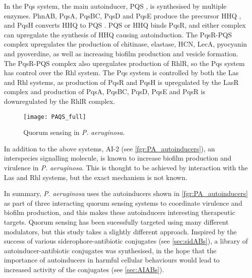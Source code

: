 In the Pqs system, the main autoinducer, PQS \cite{Pesci1999}, is synthesised by multiple enzymes. 
PhnAB\cite{Farrow2007}, PqsA, PqsBC, PqsD\cite{Lepine2003,Lepine2004} and PqsE\cite{Drees2015,Lin2018} produce the precursor HHQ , and PqsH converts HHQ  to PQS . 
PQS \cite{Wade2005} or HHQ  binds PqsR\cite{Xiao2006}, and either complex can upregulate the synthesis of HHQ  causing autoinduction. 
The PqsR-PQS complex upregulates the production of 
chitinase\cite{Deziel2005}, elastase\cite{Pesci1999}, HCN\cite{Deziel2005}, LecA\cite{Diggle2003}, pyocyanin\cite{Gallagher2002,Diggle2007} and pyoverdine\cite{Diggle2007}, as well as increasing biofilm production\cite{Diggle2003} and vesicle formation\cite{Mashburn2009}.
The PqsR-PQS complex also upregulates production of RhlR, so the Pqs system has control over the Rhl system\cite{McKnight2000}.
The Pqs system is controlled by both the Las and Rhl systems,
as production of PqsR\cite{Wade2005} and PqsH\cite{Gallagher2002} is upregulated by the LasR complex and 
production of PqsA, PqsBC, PqsD, PqsE\cite{McGrath2004} and PqsR\cite{Wade2005} is downregulated by the RhlR complex.


\begin{figure}[H]
	\begin{center}
		\texttt{[image: PAQS\_full]}
		\caption{Quorum sensing in \textit{P. aeruginosa}\cite{Dubern2008,Hodgkinson2011,Jimenez2012}. \label{fgr:PA_QS}}
	\end{center}
\end{figure}


In addition to the above systems, AI-2 (see \ref{fgr:PA_autoinducers}), an interspecies signalling molecule\cite{Pereira2013}, is known to increase biofilm production and virulence in \textit{P. aeruginosa}\cite{Li2015a,Li2017}. This is thought to be achieved by interaction with the Las and Rhl systems, but the exact mechanism is not known.

In summary, \textit{P. aeruginosa} uses the autoinducers shown in \ref{fgr:PA_autoinducers} as part of three interacting quorum sensing systems to coordinate virulence and biofilm production, and this makes these autoinducers interesting therapeutic targets. Quorum sensing has been sucessfully targeted using many different modulators\cite{Galloway2011,Hodgkinson2011}, but this study takes a slightly different approach. 
Inspired by the success of various siderophore-antibiotic conjugates (see \ref{sec:sidABs}), a library of autoinducer-antibiotic conjugates was synthesised, in the hope that the importance of autoinducers in harmful cellular behaviours would lead to increased activity of the conjugates (see \ref{sec:AIABs}).

